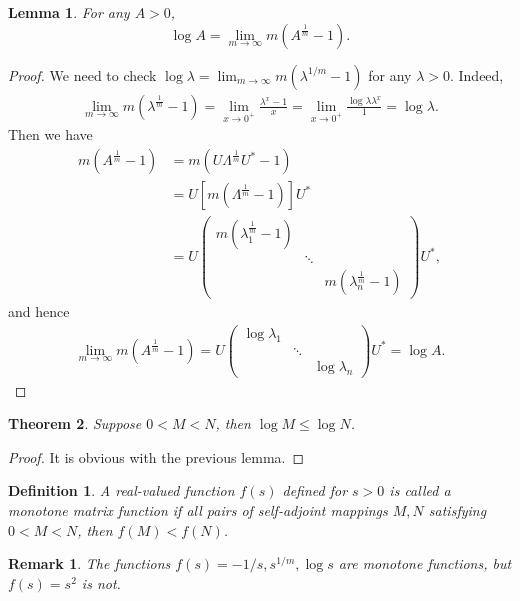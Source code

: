 \documentclass[11pt]{book}
\newtheorem{definition}{Definition}[section]
\newtheorem{theorem}{Theorem}[section]
\newtheorem{lemma}[theorem]{Lemma}
\newtheorem{remark}{Remark}[section]
\theoremstyle{definition}
\numberwithin{equation}{subsection}
\begin{document}
\begin{lemma}
For any $A > 0$, $$\log A = \lim_{m\to\infty} m \left(A^{\frac{1}{m}} - 1\right).$$
\end{lemma}
\begin{proof}
We need to check $\log \lambda = \lim_{m\to\infty} m \left(\lambda^{1/m} - 1\right)$ for any $\lambda > 0$. Indeed, 
\begin{align*}
    \lim_{m\to\infty} m \left(\lambda^{\frac{1}{m}} - 1\right) = \lim_{x\to 0^+} \frac{\lambda^x - 1}{x} = \lim_{x\to 0^+} \frac{\log \lambda \lambda^x}{1} = \log \lambda. 
\end{align*}
Then we have
\begin{align*}
    m \left(A^{\frac{1}{m}} - 1\right) & = m \left( U \Lambda^{\frac{1}{m}} U^* - 1 \right) \\
    & = U \left[m \left(\Lambda^{\frac{1}{m}} - 1\right)\right] U^* \\
    & = U \begin{pmatrix}
        m \left(\lambda_1^{\frac{1}{m}} - 1\right) &  & \\
        & \ddots & \\
        &  & m \left(\lambda_n^{\frac{1}{m}} - 1\right)
    \end{pmatrix} U^*,
\end{align*}
and hence 
\begin{align*}
    \lim_{m\to\infty} m \left(A^{\frac{1}{m}} - 1\right) = U \begin{pmatrix}
        \log \lambda_1 &  & \\
        & \ddots & \\
        &  & \log \lambda_n
    \end{pmatrix} U^* = \log A.
\end{align*}
\end{proof}

\medskip

\begin{theorem}
Suppose $0 < M < N$, then $\log M \leq \log N$.
\end{theorem}
\begin{proof}
It is obvious with the previous lemma.
\end{proof}

\medskip

\begin{definition}
A real-valued function $f(s)$ defined for $s > 0$ is called a monotone matrix function if all pairs of self-adjoint mappings $M, N$ satisfying $0 < M < N$, then $f(M) < f(N)$. 
\end{definition}
\begin{remark}
The functions $f(s) = - 1/s, s^{1/m}, \log s$ are monotone functions, but $f(s) = s^2$ is not.
\end{remark}
\end{document}
